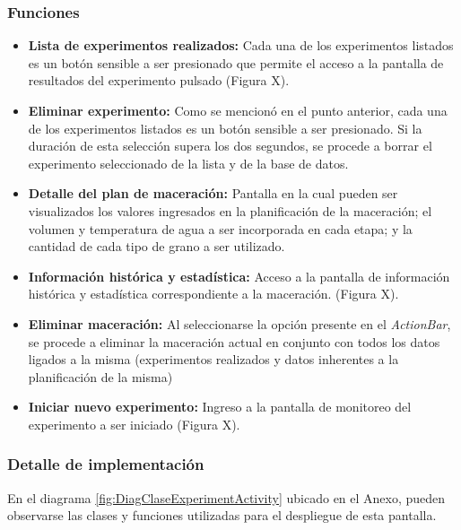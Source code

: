             \subsubsection{Funciones}
                \begin{itemize}
                    \item \textbf{Lista de experimentos realizados:} Cada una de los experimentos listados es un botón sensible a ser presionado que permite el acceso a la pantalla de resultados del experimento pulsado (Figura X).
                    
                    \item \textbf{Eliminar experimento:} Como se mencionó en el punto anterior, cada una de los experimentos listados es un botón sensible a ser presionado. Si la duración de esta selección supera los dos segundos, se procede a borrar el experimento seleccionado de la lista y de la base de datos.
                    
                    \item \textbf{Detalle del plan de maceración:} Pantalla en la cual pueden ser visualizados los valores ingresados en la planificación de la maceración; el volumen y temperatura de agua a ser incorporada en cada etapa; y la cantidad de cada tipo de grano a ser utilizado.
                    
                    \item \textbf{Información histórica y estadística:} Acceso a la pantalla de información histórica y estadística correspondiente a la maceración. (Figura X).
                    
                    \item \textbf{Eliminar maceración:} Al seleccionarse la opción presente en el \textit{ActionBar}, se procede a eliminar la maceración actual en conjunto con todos los datos ligados a la misma (experimentos realizados y datos inherentes a la planificación de la misma)
                    
                    \item \textbf{Iniciar nuevo experimento:} Ingreso a la pantalla de monitoreo del experimento a ser iniciado (Figura X).
                    
                \end{itemize}
            
            \subsubsection{Detalle de implementación}
                En el diagrama \ref{fig:DiagClaseExperimentActivity} ubicado en el Anexo, pueden observarse las clases y funciones utilizadas para el despliegue de esta pantalla.
        

